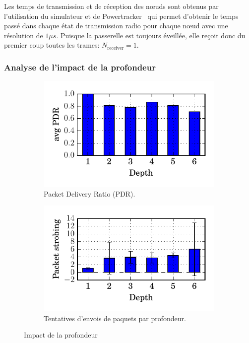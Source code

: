 Les temps de transmission et de réception des nœuds sont obtenus par l'utilisation du simulateur et de Powertracker~\cite{dunkels2011powertrace} qui permet d'obtenir le temps passé dans chaque état de transmission radio pour chaque nœud avec une résolution de $1 \mu s$.
Puisque la passerelle est toujours éveillée, elle reçoit donc du premier coup toutes les trames: $N_{\textrm{receiver}} = 1$.

\subsubsection{Analyse de l'impact de la profondeur}
\label{supervision:depth_analysis}

\begin{figure}[ht]
  \begin{subfigure}{0.5\textwidth}
    \includegraphics[width=\textwidth]{img/pdr_depth.pdf}
    \caption{Packet Delivery Ratio (PDR).}
    \label{supervision:fig:pdr_depth}
  \end{subfigure}
  \begin{subfigure}{0.5\textwidth}
    \includegraphics[width=\textwidth]{img/strobes_depth.pdf}
    \caption{Tentatives d'envois de paquets par profondeur.}
    \label{supervision:fig:strobes_depth}
  \end{subfigure}
  \caption{Impact de la profondeur}
\end{figure}

